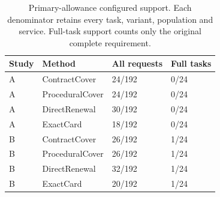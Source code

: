 \begin{table}[!htbp]\centering\small
\caption{Primary-allowance configured support. Each denominator retains every task, variant, population and service. Full-task support counts only the original complete requirement.}\label{tab:r9-support}
\begin{tabular}{@{}llll@{}}\toprule
Study & Method & All requests & Full tasks\\\midrule
A & ContractCover & 24/192 & 0/24\\
A & ProceduralCover & 24/192 & 0/24\\
A & DirectRenewal & 30/192 & 0/24\\
A & ExactCard & 18/192 & 0/24\\
B & ContractCover & 26/192 & 1/24\\
B & ProceduralCover & 26/192 & 1/24\\
B & DirectRenewal & 32/192 & 1/24\\
B & ExactCard & 20/192 & 1/24\\
\bottomrule\end{tabular}\end{table}
